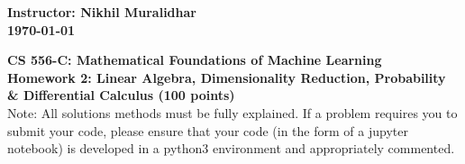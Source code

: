 \documentclass{article}%
\begin{document}
\begin{flushleft}
\textbf{Instructor: Nikhil Muralidhar \\
\today}
\end{flushleft}

\begin{center}
\textbf{\Large CS 556-C: Mathematical Foundations of Machine Learning \\
Homework 2: Linear Algebra, Dimensionality Reduction, Probability \& Differential Calculus (100 points)} \\
\vspace{2ex}
Note: All solutions methods must be fully explained. If a problem requires you to submit your code, please ensure that your code (in the form of a jupyter notebook) is developed in a python3 environment and appropriately commented.
\end{center}
\end{document}
